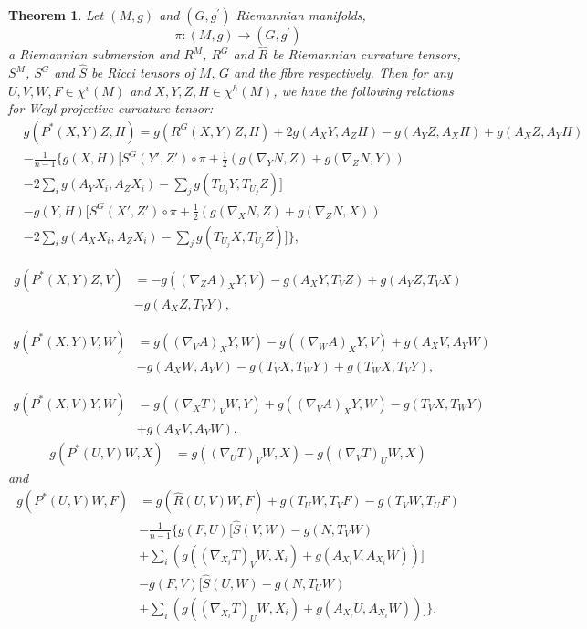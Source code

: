 \documentclass{birkjour}
\newtheorem{theorem}{Theorem}[section]
\theoremstyle{definition}
\theoremstyle{remark}
\numberwithin{equation}{section}
\begin{document}
\begin{theorem}
	Let $(M, g)$ and $(G, g^\prime)$ Riemannian manifolds,
	$$\pi: (M, g) \to(G, g^\prime)$$
	a Riemannian submersion and $R^M$, $R^G$ and $\hat{R}$ be Riemannian curvature tensors, $S^M$, $S^G$ and $\hat{S}$ be Ricci tensors of $M, \, G$ and the fibre respectively. Then for any $U, V, W, F \in \chi^v (M)$ and $X, Y, Z, H\in  \chi^h (M)$, we have the following relations for Weyl projective curvature tensor:
	\begin{align*}
		&g(P^*(X,Y)Z, H)\!\!=\!\!g(R^G (X,Y)Z, H)\!+\!2g (A_{X}Y, A_{Z}H)\!-\!g (A_{Y}Z, A_{X}H)\!+\!g (A_{X}Z, A_{Y}H)\\
		&- \frac{1}{n-1} \Bigg\{ g(X,H) \bigg[S^G (Y', Z') \circ \pi + \frac{1}{2} \left(g(\nabla_Y N,Z)+ g(\nabla_Z N,Y )  \right) \\
		&-2 \sum_{i} g(A_Y X_i, A_Z X_i) - \sum_{j} g(T_{U_j}Y, T_{U_j}Z)\bigg] \\
		&- g(Y,H) \bigg[S^G (X', Z') \circ \pi + \frac{1}{2} \left(g(\nabla_X N,Z)+ g(\nabla_Z N,X )  \right) \\
		&-2 \sum_{i} g(A_X X_i, A_Z X_i) - \sum_{j} g(T_{U_j}X, T_{U_j}Z)\bigg] \Bigg\},
	\end{align*}
	
	\begin{align*}
		g(P^*(X,Y)Z, V) &=-g((\nabla_Z A)_X Y, V) - g(A_X Y, T_V Z)+ g(A_Y Z, T_V X)\\
		&- g(A_X Z, T_V Y),
	\end{align*}
	
	\begin{align*}
		g(P^*(X,Y)V, W) &= g((\nabla_V A)_X Y, W) - g((\nabla_W A)_X Y, V) + g(A_X V, A_Y W)\\
		& - g(A_X W, A_Y V)- g(T_V X, T_W Y)+ g(T_W X, T_V Y),
	\end{align*}
	
	\begin{align*}
		g(P^*(X,V)Y, W) &=  g((\nabla_X T)_V W, Y) + g((\nabla_V A)_X Y, W) 
		- g(T_V X, T_W Y)\\
		& + g(A_X V, A_Y W),
	\end{align*}
	\begin{align*}
		g(P^*(U,V)W, X)&=g((\nabla_U T)_V W, X) - g((\nabla_V T)_U W, X)
	\end{align*}
	and
	\begin{align*}
		g(P^*(U,V)W, F)&= g( \hat{R} (U,V)W , F)+ g (T_{U}W, T_{V}F )- g (T_{V}W, T_{U}F) \\
		&- \frac{1}{n-1} \Bigg\{ g(F,U) \bigg[\hat{S} (V, W) - g(N,T_V W)  \\
		&+  \sum_{i} \left( g((\nabla_{X_i} T)_V W, X_i)+g(A_{X_i} V, A_{X_i} W)\right)\bigg] \\
		&- g(F,V) \bigg[\hat{S} (U, W) - g(N,T_U W)   \\
		&+  \sum_{i} \left( g((\nabla_{X_i} T)_U W, X_i)+g(A_{X_i} U, A_{X_i} W)\right)\bigg]\Bigg\}.
	\end{align*}
\end{theorem}
\end{document}
